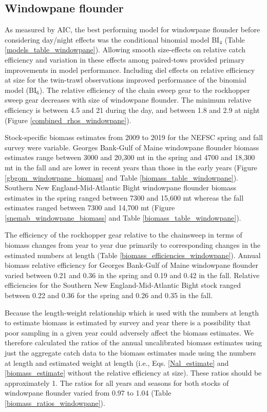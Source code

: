 \documentclass[12pt,letterpaper, leqno]{article}
\begin{document}
\subsection*{Windowpane flounder}

As measured by AIC, the best performing model for windowpane flounder before considering day/night effects was the conditional binomial model BI$_4$ (Table \ref{models_table_windowpane}). Allowing smooth size-effects on relative catch efficiency and variation in these effects among paired-tows provided primary improvements in model performance. Including diel effects on relative efficiency at size for the twin-trawl observations improved performance of the binomial model (BI$_6$). The relative efficiency of the chain sweep gear to the rockhopper sweep gear decreases with size of windowpane flounder. The minimum relative efficiency is between 4.5 and 21 during the day, and between 1.8 and 2.9 at night (Figure \ref{combined_rhos_windowpane}). 

Stock-specific biomass estimates from 2009 to 2019 for the NEFSC spring and fall survey were variable. Georges Bank-Gulf of Maine windowpane flounder biomass estimates range between 3000 and 20,300 mt in the spring and 4700 and 18,300 mt in the fall and are lower in recent years than those in the early years (Figure \ref{gbgom_windowpane_biomass} and Table \ref{biomass_table_windowpane}). Southern New England-Mid-Atlantic Bight windowpane flounder biomass estimates in the spring ranged between 7300 and 15,600 mt whereas the fall estimates ranged between 7300 and 14,700 mt (Figure \ref{snemab_windowpane_biomass} and Table \ref{biomass_table_windowpane}).

The efficiency of the rockhopper gear relative to the chainsweep in terms of biomass changes from year to year due primarily to corresponding changes in the estimated numbers at length (Table \ref{biomass_efficiencies_windowpane}). Annual biomass relative efficiency for Georges Bank-Gulf of Maine windowpane flounder varied between 0.21 and 0.36 in the spring and 0.19 and 0.42 in the fall. Relative efficiencies for the Southern New England-Mid-Atlantic Bight stock ranged between 0.22 and 0.36 for the spring and 0.26 and 0.35 in the fall.

Because the length-weight relationship which is used with the numbers at length to estimate biomass is estimated by survey and year there is a possibility that poor sampling in a given year could adversely affect the biomass estimates.  We therefore calculated the ratios of the annual uncalibrated biomass estimates using just the aggregate catch data to the biomass estimates made using the numbers at length and estimated weight at length (i.e., Eqs. \ref{Nal_estimate} and \ref{biomass_estimate} without the relative efficiency at size). These ratios should be approximately 1. The ratios for all years and seasons for both stocks of windowpane flounder varied from 0.97 to 1.04 (Table \ref{biomass_ratios_windowpane}).
\end{document}
